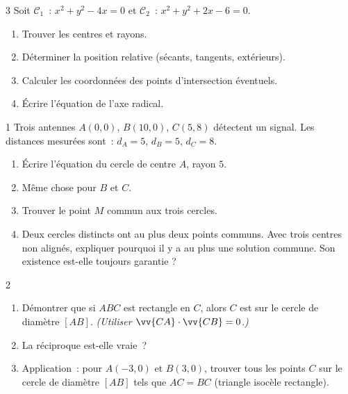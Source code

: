 \begin{probleme}{3}
Soit $\mathcal{C}_1$~: $x^2+y^2-4x=0$ et $\mathcal{C}_2$~: $x^2+y^2+2x-6=0$.
\begin{enumerate}
  \item Trouver les centres et rayons.
  \item D\'eterminer la position relative (s\'ecants, tangents, ext\'erieurs).
  \item Calculer les coordonn\'ees des points d'intersection \'eventuels.
  \item \'Ecrire l'\'equation de l'axe radical.
\end{enumerate}
\end{probleme}

\begin{probleme}{1}
Trois antennes $A(0,0)$, $B(10,0)$, $C(5,8)$ d\'etectent un signal.
Les distances mesur\'ees sont~: $d_A=5$, $d_B=5$, $d_C=8$.
\begin{enumerate}
  \item \'Ecrire l'\'equation du cercle de centre $A$, rayon $5$.
  \item M\^eme chose pour $B$ et $C$.
  \item Trouver le point $M$ commun aux trois cercles.
  \item Deux cercles distincts ont au plus deux points communs.
        Avec trois centres non align\'es, expliquer pourquoi il y a au plus
        une solution commune. Son existence est-elle toujours garantie ?
\end{enumerate}
\end{probleme}

\begin{probleme}{2}
\begin{enumerate}
  \item D\'emontrer que si $ABC$ est rectangle en $C$, alors $C$ est sur le cercle
        de diam\`etre $[AB]$.
        \emph{(Utiliser $\vv{CA}\cdot\vv{CB}=0$.)}
  \item La r\'eciproque est-elle vraie~?
  \item Application~: pour $A(-3,0)$ et $B(3,0)$, trouver tous les points $C$
        sur le cercle de diam\`etre $[AB]$ tels que $AC=BC$ (triangle isoc\`ele rectangle).
\end{enumerate}
\end{probleme}

